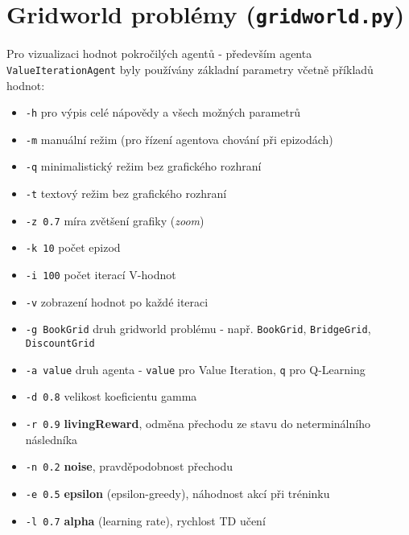 \section{Gridworld problémy (\texttt{gridworld.py})}
\label{priloha:manualg}
Pro vizualizaci hodnot pokročilých agentů - především agenta \texttt{ValueIterationAgent} byly používány základní parametry včetně příkladů hodnot:
\begin{itemize}
\item \texttt{-h} pro výpis celé nápovědy a všech možných parametrů
\item \texttt{-m} manuální režim (pro řízení agentova chování při epizodách)
\item \texttt{-q} minimalistický režim bez grafického rozhraní
\item \texttt{-t} textový režim bez grafického rozhraní
\item \texttt{-z 0.7} míra zvětšení grafiky (\textit{zoom})
\item \texttt{-k 10} počet epizod
\item \texttt{-i 100} počet iterací V-hodnot
\item \texttt{-v} zobrazení hodnot po každé iteraci
\item \texttt{-g BookGrid} druh gridworld problému - např. \texttt{BookGrid}, \texttt{BridgeGrid}, \texttt{DiscountGrid}
\item \texttt{-a value} druh agenta - \texttt{value} pro Value Iteration, \texttt{q} pro Q-Learning
\item \texttt{-d 0.8} velikost koeficientu gamma
\item \texttt{-r 0.9} \textbf{livingReward}, odměna přechodu ze stavu do neterminálního následníka
\item \texttt{-n 0.2} \textbf{noise}, pravděpodobnost přechodu 
\item \texttt{-e 0.5} \textbf{epsilon} (epsilon-greedy), náhodnost akcí při tréninku
\item \texttt{-l 0.7} \textbf{alpha} (learning rate), rychlost TD učení
\end{itemize}

